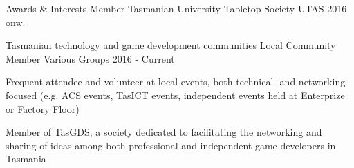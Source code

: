\begin{tmrsection}{Awards \& Interests}
\tmrcolumnentry
    {Member}
    {Tasmanian University Tabletop Society}
    {UTAS}
    {2016 onw.}

\tmrlistentry
    {Tasmanian technology and game development communities}
    {Local Community Member}
    {Various Groups}
    {2016 - Current}
    {\item Frequent attendee and volunteer at local events, both technical- and networking-focused (e.g. ACS events, TasICT events,  independent events held at Enterprize or Factory Floor)
      	\item Member of TasGDS, a society dedicated to facilitating the networking and sharing of ideas among both professional and independent game developers in Tasmania}

\end{tmrsection}
